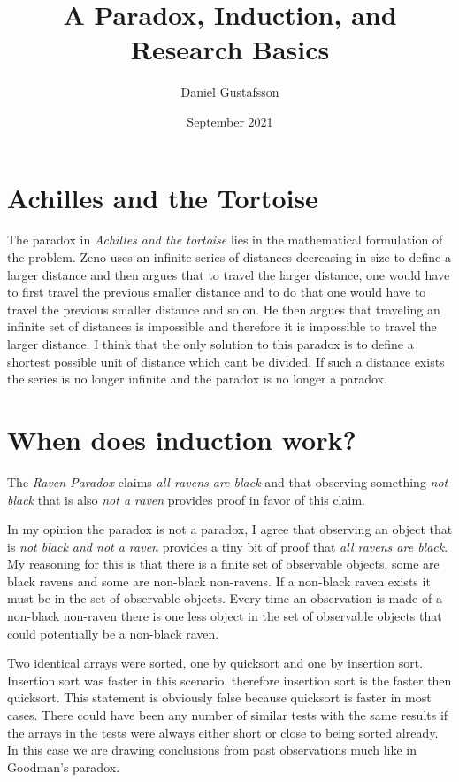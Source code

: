 \documentclass[11pt,a4paper]{article}
\begin{document}
\title{A Paradox, Induction, and Research Basics}
\author{Daniel Gustafsson}
\date{September 2021}
\maketitle

\section{Achilles and the Tortoise}
The paradox in \textit{Achilles and the tortoise} lies in the mathematical formulation of the problem.
Zeno uses an infinite series of distances decreasing in size to define a larger distance and then argues that to travel the larger distance,
one would have to first travel the previous smaller distance and to do that one would have to travel the previous smaller distance and so on.
He then argues that traveling an infinite set of distances is impossible and therefore it is impossible to travel the larger distance.
I think that the only solution to this paradox is to define a shortest possible unit of distance which cant be divided. 
If such a distance exists the series is no longer infinite and the paradox is no longer a paradox.


\section{When does induction work?}
The \textit{Raven Paradox} claims \textit{all ravens are black} and that observing something \textit{not black} that is also \textit{not a raven}
provides proof in favor of this claim.

In my opinion the paradox is not a paradox, I agree that observing an object that is \textit{not black and not a raven} provides a tiny bit of proof
that \textit{all ravens are black}. My reasoning for this is that there is a finite set of observable objects, some are black ravens and some are
non-black non-ravens. If a non-black raven exists it must be in the set of observable objects. Every time an observation is made of a non-black non-raven
there is one less object in the set of observable objects that could potentially be a non-black raven.

Two identical arrays were sorted, one by quicksort and one by insertion sort. Insertion sort was faster in this scenario,
therefore insertion sort is the faster then quicksort. This statement is obviously false because quicksort is faster in most cases.
There could have been any number of similar tests with the same results if the arrays in the tests were always either short or close to being
sorted already. In this case we are drawing conclusions from past observations much like in Goodman's paradox.
\end{document}
